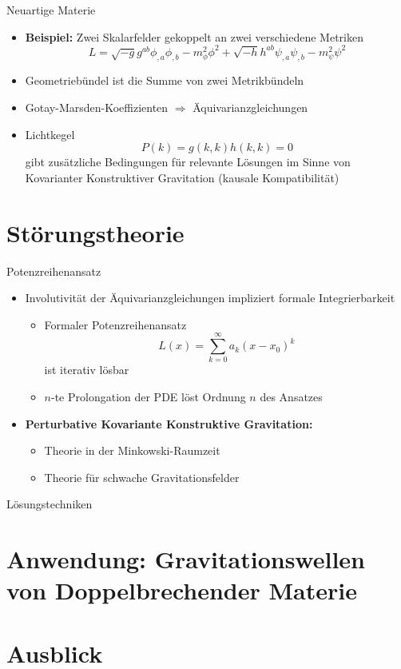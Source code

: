 \documentclass{beamer}
\begin{document}
    \begin{frame}{Neuartige Materie}
        \begin{itemize}
            \item \textbf{Beispiel:} Zwei Skalarfelder gekoppelt an zwei verschiedene Metriken
            \[ L = \sqrt{-g} g^{ab} \phi_{,a}\phi_{,b} - m_\phi^2 \phi^2 + \sqrt{-h} h^{ab} \psi_{,a}\psi_{,b} - m_\psi^2 \psi^2 \] \pause
            \item Geometriebündel ist die Summe von zwei Metrikbündeln \pause
            \item Gotay-Marsden-Koeffizienten $\Rightarrow$ Äquivarianzgleichungen \pause
            \item Lichtkegel
            \[ P(k) = g(k,k) h(k,k) = 0 \]
            gibt zusätzliche Bedingungen für relevante Lösungen im Sinne von Kovarianter
            Konstruktiver Gravitation (kausale Kompatibilität)
        \end{itemize}
    \end{frame}


    \section{Störungstheorie}\label{sec:stoerungstheorie}

    \begin{frame}{Potenzreihenansatz}
        \begin{itemize}
            \item Involutivität der Äquivarianzgleichungen impliziert formale Integrierbarkeit
            \begin{itemize}
                \item Formaler Potenzreihenansatz \[ L(x) = \sum_{k=0}^\infty a_k (x-x_0)^k \] ist iterativ lösbar
                \item $n$-te Prolongation der PDE löst Ordnung $n$ des Ansatzes
            \end{itemize}
            \item \textbf{Perturbative Kovariante Konstruktive Gravitation:}
            \begin{itemize}
                \item {} Theorie in der \alert{Minkowski}-Raumzeit
                \item {} Theorie für schwache Gravitationsfelder
            \end{itemize}
        \end{itemize}
    \end{frame}

    \begin{frame}{Lösungstechniken}
    \end{frame}


    \section{Anwendung: Gravitationswellen von Doppelbrechender Materie}\label{sec:anwendung}


    \section{Ausblick}\label{sec:ausblick}
\end{document}

